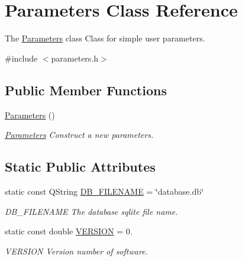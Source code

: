 \hypertarget{classParameters}{\section{Parameters Class Reference}
\label{classParameters}
}


The \hyperlink{classParameters}{Parameters} class Class for simple user parameters.  




{\ttfamily \#include $<$parameters.\-h$>$}

\subsection*{Public Member Functions}
\begin{DoxyCompactItemize}
\item 
\hypertarget{classParameters_af4d94ee360ac0157d9065f78797fe9a1}{\hyperlink{classParameters_af4d94ee360ac0157d9065f78797fe9a1}{Parameters} ()}\label{classParameters_af4d94ee360ac0157d9065f78797fe9a1}

\begin{DoxyCompactList}\small\item\em \hyperlink{classParameters}{Parameters} Construct a new parameters. \end{DoxyCompactList}\end{DoxyCompactItemize}
\subsection*{Static Public Attributes}
\begin{DoxyCompactItemize}
\item 
static const Q\-String \hyperlink{classParameters_a80b98bd51d910bcc2203afcacbc7df87}{D\-B\-\_\-\-F\-I\-L\-E\-N\-A\-M\-E} = \char`\"{}database.\-db\char`\"{}
\begin{DoxyCompactList}\small\item\em D\-B\-\_\-\-F\-I\-L\-E\-N\-A\-M\-E The database sqlite file name. \end{DoxyCompactList}\item 
static const double \hyperlink{classParameters_a279ee24140c761de46178daa8960bdc8}{V\-E\-R\-S\-I\-O\-N} = 0.
\begin{DoxyCompactList}\small\item\em V\-E\-R\-S\-I\-O\-N Version number of software. \end{DoxyCompactList}\end{DoxyCompactItemize}


